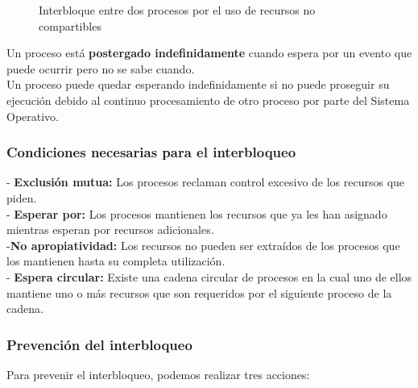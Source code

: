 \documentclass[spanish, 12pt]{article}
\begin{document}
			\begin{figure}[H]
				\centerline{}
				\caption*{Interbloque entre dos procesos por el uso de recursos no compartibles}
			\end{figure}
		
			Un proceso está \textbf{postergado indefinidamente} cuando espera por un evento que puede ocurrir pero no se sabe cuando.\\
		
			Un proceso puede quedar esperando indefinidamente si no puede proseguir su ejecución debido al continuo procesamiento de otro proceso por parte del Sistema Operativo.\\
		
			\subsubsection{Condiciones necesarias para el interbloqueo}
			
				- \textbf{Exclusión mutua:} Los procesos reclaman control excesivo de los recursos que piden.\\
				
				- \textbf{Esperar por:} Los procesos mantienen los recursos que ya les han asignado mientras esperan por recursos adicionales.\\
				
				-\textbf{No apropiatividad:} Los recursos no pueden ser extraídos de los procesos que los mantienen hasta su completa utilización.\\
				
				- \textbf{Espera circular:} Existe una cadena circular de procesos en la cual uno de ellos mantiene uno o más recursos que son requeridos por el siguiente proceso de la cadena.\\
				
			\subsubsection{Prevención del interbloqueo}
			
				Para prevenir el interbloqueo, podemos realizar tres acciones:\\
			
\end{document}
